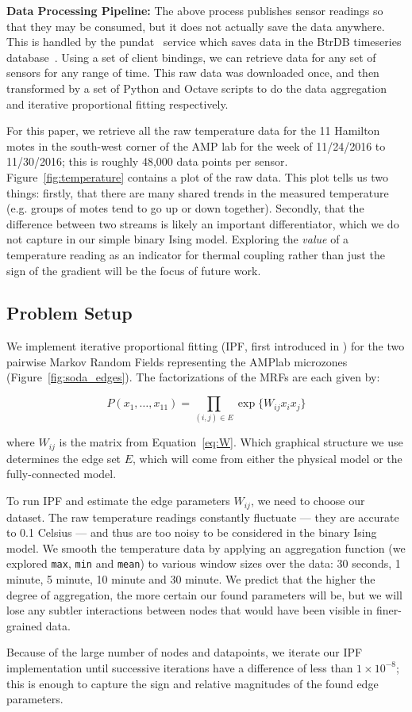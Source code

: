 \textbf{Data Processing Pipeline:} The above process publishes sensor readings so that they may be consumed, but it does not actually save the data anywhere.
This is handled by the pundat~\cite{pundat} service which saves data in the BtrDB timeseries database~\cite{andersen2016btrdb}.
Using a set of client bindings, we can retrieve data for any set of sensors for any range of time.
This raw data was downloaded once, and then transformed by a set of Python and Octave scripts to do the data aggregation and iterative proportional fitting respectively.

For this paper, we retrieve all the raw temperature data for the 11 Hamilton motes in the south-west corner of the AMP lab for the week of 11/24/2016 to 11/30/2016; this is roughly 48,000 data points per sensor.
Figure~\ref{fig:temperature} contains a plot of the raw data.
This plot tells us two things: firstly, that there are many shared trends in the measured temperature (e.g. groups of motes tend to go up or down together).
Secondly, that the difference between two streams is likely an important differentiator, which we do not capture in our simple binary Ising model.
Exploring the \emph{value} of a temperature reading as an indicator for thermal coupling rather than just the sign of the gradient will be the focus of future work.

\subsection{Problem Setup}

We implement iterative proportional fitting (IPF, first introduced in \cite{deming1940least}) for the two pairwise Markov Random Fields representing the AMPlab microzones (Figure~\ref{fig:soda_edges}).
The factorizations of the MRFs are each given by:

\begin{equation}
P(x_1,\ldots,x_{11}) = \prod_{(i,j) \in E} \exp\lbrace W_{ij}x_ix_j\rbrace
\end{equation}

where $W_{ij}$ is the matrix from Equation~\ref{eq:W}.
Which graphical structure we use determines the edge set $E$, which will come from either the physical model or the fully-connected model.

To run IPF and estimate the edge parameters $W_{ij}$, we need to choose our dataset.
The raw temperature readings constantly fluctuate --- they are accurate to 0.1 Celsius --- and thus are too noisy to be considered in the binary Ising model.
We smooth the temperature data by applying an aggregation function (we explored \texttt{max}, \texttt{min} and \texttt{mean}) to various window sizes over the data: 30 seconds, 1 minute, 5 minute, 10 minute and 30 minute.
We predict that the higher the degree of aggregation, the more certain our found parameters will be, but we will lose any subtler interactions between nodes that would have been visible in finer-grained data.

Because of the large number of nodes and datapoints, we iterate our IPF implementation until successive iterations have a difference of less than $1 \times 10^{-8}$; this is enough to capture the sign and relative magnitudes of the found edge parameters.
